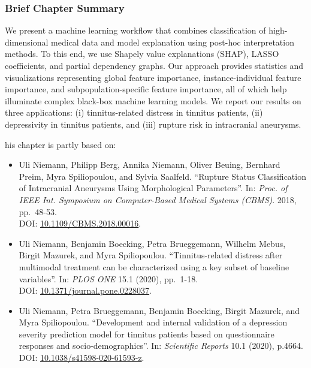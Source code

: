 \documentclass[
  oneside]{book}
\providecommand{\tightlist}{%
  \setlength{\itemsep}{0pt}\setlength{\parskip}{0pt}}
\newenvironment{infobox}[1]
  {
  \begin{chapter-summary}
  }
  {
  \end{chapter-summary}
  }
\begin{document}
\begin{infobox}{tasks.pdf}

\hypertarget{brief-chapter-summary-5}{%
\subsubsection*{Brief Chapter Summary}\label{brief-chapter-summary-5}}

We present a machine learning workflow that combines classification of high-dimensional medical data and model explanation using post-hoc interpretation methods.
To this end, we use Shapely value explanations (SHAP), LASSO coefficients, and partial dependency graphs.
Our approach provides statistics and visualizations representing global feature importance, instance-individual feature importance, and subpopulation-specific feature importance, all of which help illuminate complex black-box machine learning models.
We report our results on three applications: (i) tinnitus-related distress in tinnitus patients, (ii) depressivity in tinnitus patients, and (iii) rupture risk in intracranial aneurysms.

\end{infobox}

\begin{infobox}

This chapter is partly based on:

\begin{itemize}
\tightlist
\item
  Uli Niemann, Philipp Berg, Annika Niemann, Oliver Beuing, Bernhard Preim, Myra Spiliopoulou, and Sylvia Saalfeld. ``Rupture Status Classification of Intracranial Aneurysms Using Morphological Parameters''. In: \emph{Proc. of IEEE Int. Symposium on Computer-Based Medical Systems (CBMS)}. 2018, pp.~48-53.\\
  DOI: \href{https://doi.org/10.1109\%2FCBMS.2018.00016}{10.1109/CBMS.2018.00016}.
\item
  Uli Niemann, Benjamin Boecking, Petra Brueggemann, Wilhelm Mebus, Birgit Mazurek, and Myra Spiliopoulou. ``Tinnitus-related distress after multimodal treatment can be characterized using a key subset of baseline variables''. In: \emph{PLOS ONE} 15.1 (2020), pp.~1-18.\\
  DOI: \href{https://doi.org/10.1371\%2Fjournal.pone.0228037}{10.1371/journal.pone.0228037}.
\item
  Uli Niemann, Petra Brueggemann, Benjamin Boecking, Birgit Mazurek, and Myra Spiliopoulou. ``Development and internal validation of a depression severity prediction model for tinnitus patients based on questionnaire responses and socio-demographics''. In: \emph{Scientific Reports} 10.1 (2020), p.4664.\\
  DOI: \href{https://doi.org/10.1038\%2Fs41598-020-61593-z}{10.1038/s41598-020-61593-z}.
\end{itemize}

\end{infobox}
\end{document}
